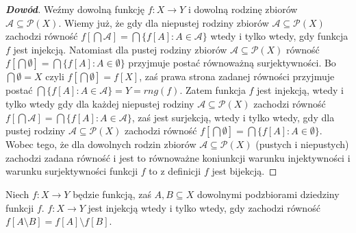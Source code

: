 \begin{proof}[\textbf{Dowód}]
Weźmy dowolną funkcję $f:X\rightarrow Y$ i dowolną rodzinę zbiorów $\mathcal{A}\subseteq\mathcal{P}(X)$. Wiemy już, że gdy dla niepustej rodziny zbiorów $\mathcal{A}\subseteq\mathcal{P}(X)$ zachodzi równość $f[\bigcap\mathcal{A}]=\bigcap\{f[A]:A\in\mathcal{A}\}$ wtedy i tylko wtedy, gdy funkcja $f$ jest injekcją. Natomiast dla pustej rodziny zbiorów $\mathcal{A}\subseteq\mathcal{P}(X)$ równość $f[\bigcap\emptyset]=\bigcap\{f[A]:A\in\emptyset\}$ przyjmuje postać równoważną surjektywności. Bo $\bigcap\emptyset=X$ czyli $f[\bigcap\emptyset]=f[X]$, zaś prawa strona zadanej równości przyjmuje postać $\bigcap\{f[A]:A\in\mathcal{A}\}=Y=rng(f)$. Zatem funkcja $f$ jest injekcją, wtedy i tylko wtedy gdy dla każdej niepustej rodziny $\mathcal{A}\subseteq\mathcal{P}(X)$ zachodzi równość $f[\bigcap\mathcal{A}]=\bigcap\{f[A]:A\in\mathcal{A}\}$, zaś jest surjekcją, wtedy i tylko wtedy, gdy dla pustej rodziny $\mathcal{A}\subseteq\mathcal{P}(X)$ zachodzi równość $f[\bigcap\emptyset]=\bigcap\{f[A]:A\in\emptyset\}$. Wobec tego, że dla dowolnych rodzin zbiorów $\mathcal{A}\subseteq\mathcal{P}(X)$ (pustych i niepustych) zachodzi zadana równość i jest to równoważne koniunkcji warunku injektywności i warunku surjektywności funkcji $f$ to z definicji $f$ jest bijekcją.
\end{proof}
\begin{theorem}
Niech $f:X\rightarrow Y$ będzie funkcją, zaś $A,B\subseteq X$ dowolnymi podzbiorami dziedziny funkcji $f$. $f:X\rightarrow Y$ jest injekcją wtedy i tylko wtedy, gdy zachodzi równość $f[A\setminus B]=f[A]\setminus f[B]$.
\end{theorem}
